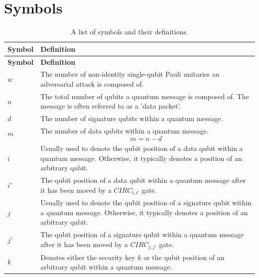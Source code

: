 \chapter{Symbols}
\label{sec:symbols}
\begin{xltabular}{\linewidth}{ l | X }
  \caption{A list of symbols and their definitions.} 
 \label{table:symboldescription}\\
 \hline \hline

\textbf{\normalsize Symbol} & \textbf{\normalsize Definition}  \\
 \hline 
\endfirsthead
 \hline \hline

\textbf{\normalsize Symbol} & \textbf{\normalsize Definition}  \\
 \hline 
\endhead

$w$ & The number of non-identity single-qubit Pauli unitaries an adversarial attack is composed of. 
\\ \hline

$n$ & The total number of qubits a quantum message is composed of. The message is often referred to as a 'data packet'.
\\ \hline

$d$ & The number of signature qubits within a quantum message.
\\ \hline

$m$ & The number of data qubits within a quantum message.
$$m = n - d$$
\\ \hline

$i$ & Usually used to denote the qubit position of a data qubit within a quantum message. Otherwise, it typically denotes a position of an arbitrary qubit.
\\ \hline

$i'$ & The qubit position of a data qubit within a quantum message after it has been moved by a $\mathit{CIRC}_{i,i'}$ gate.
\\ \hline

$j$ & Usually used to denote the qubit position of a signature qubit within a quantum message. Otherwise, it typically denotes a position of an arbitrary qubit.
\\ \hline

$j'$ & The qubit position of a signature qubit within a quantum message after it has been moved by a $\mathit{CIRC}_{j,j'}$ gate.
\\ \hline

$k$ & Denotes either the security key $k$ or the qubit position of an arbitrary qubit within a quantum message.
\\ \hline


\end{xltabular}
